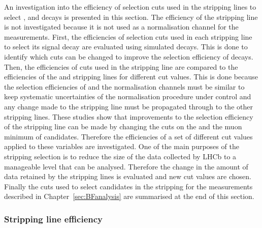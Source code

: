 An investigation into the efficiency of selection cuts used in the stripping lines to select \bmumu, \bhh and \bujpsik decays is presented in this section. %
The efficiency of the \bsjpsiphi stripping line is not investigated because it is not used as a normalisation channel for the \BF measurements. 
First, the efficiencies of selection cuts used in each stripping line to select its signal decay are evaluated using simulated decays. This is done to identify which cuts can be changed to improve the selection efficiency of \bmumu decays.
Then, the efficiencies of cuts used in the \bmumu stripping line are compared to the efficiencies of the \bhh and \bujpsik stripping lines for different cut values. %
This is done because the selection efficiencies of \bmumu and the normalisation channels must be similar to keep systematic uncertainties of the normalisation procedure under control and any change made to the \bmumu stripping line must be propagated through to the other stripping lines. 
These studies show that improvements to the selection efficiency of the \bmumu stripping line can be made by changing the cuts on the \bsd \chiFD and the muon minimum \chiIP of \bmumu candidates. Therefore the efficiencies of a set of different cut values applied to these variables are investigated. %
One of the main purposes of the stripping selection is to reduce the size of the data collected by LHCb to a manageable level that can be analysed. Therefore the change in the amount of data retained by the stripping lines is evaluated and new cut values are chosen. Finally the cuts used to select candidates in the stripping for the \BF measurements described in Chapter~\ref{sec:BFanalysis} are summarised at the end of this section.


\subsubsection*{Stripping line efficiency}



